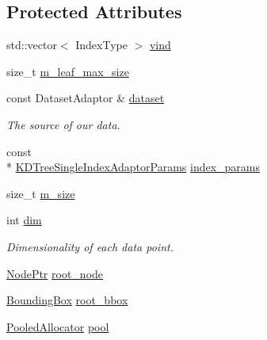 \subsection*{Protected Attributes}
\begin{DoxyCompactItemize}
\item 
std\-::vector$<$ Index\-Type $>$ \hyperlink{classnanoflann_1_1_k_d_tree_single_index_adaptor_a6d870be761aaf13d1a9b318d4d448469}{vind}
\item 
size\-\_\-t \hyperlink{classnanoflann_1_1_k_d_tree_single_index_adaptor_a8432e2663bddef7a96f034dc10e40727}{m\-\_\-leaf\-\_\-max\-\_\-size}
\item 
const Dataset\-Adaptor \& \hyperlink{classnanoflann_1_1_k_d_tree_single_index_adaptor_ac08149f85032de7a730ba92ebc1f9782}{dataset}
\begin{DoxyCompactList}\small\item\em The source of our data. \end{DoxyCompactList}\item 
const \\*
\hyperlink{structnanoflann_1_1_k_d_tree_single_index_adaptor_params}{K\-D\-Tree\-Single\-Index\-Adaptor\-Params} \hyperlink{classnanoflann_1_1_k_d_tree_single_index_adaptor_a053e2ff7d92476c2201ee4093ade23aa}{index\-\_\-params}
\item 
size\-\_\-t \hyperlink{classnanoflann_1_1_k_d_tree_single_index_adaptor_ae3fb51b45d175da41f23e881fffc40da}{m\-\_\-size}
\item 
int \hyperlink{classnanoflann_1_1_k_d_tree_single_index_adaptor_a1b818d32a7f9c58bee114a25e3539969}{dim}
\begin{DoxyCompactList}\small\item\em Dimensionality of each data point. \end{DoxyCompactList}\item 
\hyperlink{classnanoflann_1_1_k_d_tree_single_index_adaptor_a790d9a422739532c647e87e0f334b3c5}{Node\-Ptr} \hyperlink{classnanoflann_1_1_k_d_tree_single_index_adaptor_a1dd45d22dddb21bdd30695ac5e443364}{root\-\_\-node}
\item 
\hyperlink{classnanoflann_1_1_k_d_tree_single_index_adaptor_a4ba3fe322e4ded9cb1530476c971be24}{Bounding\-Box} \hyperlink{classnanoflann_1_1_k_d_tree_single_index_adaptor_a691ddd52bbdb882177cc21d1162df05b}{root\-\_\-bbox}
\item 
\hyperlink{classnanoflann_1_1_pooled_allocator}{Pooled\-Allocator} \hyperlink{classnanoflann_1_1_k_d_tree_single_index_adaptor_ae8ccbdf98502c57ccc4206de59ed28e1}{pool}
\end{DoxyCompactItemize}


